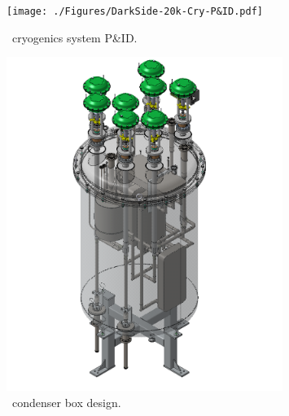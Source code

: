\begin{figure}[!t]
\texttt{[image: ./Figures/DarkSide-20k-Cry-P\&ID.pdf]}
\caption[\DSks\ cryogenics system P\&ID]{\DSks\ cryogenics system P\&ID.}
\label{fig:DSCryo}
\end{figure}


\begin{figure}[!t]
\includegraphics[width=0.8\textwidth]{./Figures/condenser_box_crop.png}
\caption[\DSks\ condenser box design]{\DSks\ condenser box design.}
\label{fig:DSCondenser}
\end{figure}


